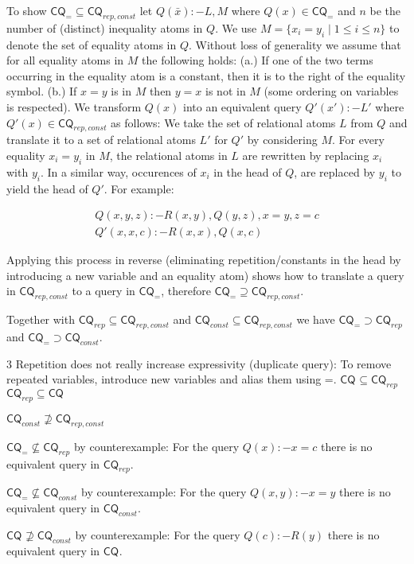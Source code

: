 \documentclass[a4paper,12pt]{article}
\newcommand{\cq}[1]{\ensuremath{\mathsf{CQ}_{#1}}}
\begin{document}
To show $\cq{=} \subseteq \cq{rep,const}$ let $Q(\bar{x}) :- L, M$ where $Q(x) \in \cq{=}$ and $n$ be the number of (distinct) inequality atoms in $Q$. We use $M = \{ x_i = y_i \mid 1 \leq i \leq n\}$ to denote the set of equality atoms in $Q$. Without loss of generality we assume that for all equality atoms in $M$ the following holds: (a.) If one of the two terms occurring in the equality atom is a constant, then it is to the right of the equality symbol. (b.) If $x = y$ is in $M$ then $y = x$ is not in $M$ (some ordering on variables is respected). We transform $Q(x)$ into an equivalent query $Q'(x') :- L'$ where $Q'(x) \in \cq{rep,const}$ as follows: We take the set of relational atoms $L$ from $Q$ and translate it to a set of relational atoms $L'$ for $Q'$ by considering $M$. For every equality $x_i = y_i$ in $M$, the relational atoms in $L$ are rewritten by replacing $x_i$ with $y_i$. In a similar way, occurences of $x_i$ in the head of $Q$, are replaced by $y_i$ to yield the head of $Q'$. For example:

\begin{align}
Q(x,y,z) :- R(x,y), Q(y,z), x = y, z = c \\
Q'(x,x,c) :- R(x,x), Q(x,c)
\end{align}

Applying this process in reverse (eliminating repetition/constants in the head by introducing a new variable and an equality atom) shows how to translate a query in \cq{rep,const} to a query in \cq{=}, therefore $\cq{=} \supseteq \cq{rep,const}$.

Together with $\cq{rep} \subseteq \cq{rep,const}$ and $\cq{const} \subseteq \cq{rep,const}$ we have $\cq{=} \supset \cq{rep}$ and $\cq{=} \supset \cq{const}$.

3 Repetition does not really increase expressivity (duplicate query):
To remove repeated variables, introduce new variables and alias them using =.
$\cq{}    \subseteq \cq{rep}$
$\cq{rep} \subseteq \cq{}$

$\cq{const} \not \supseteq \cq{rep,const}$

$\cq{=} \not \subseteq \cq{rep}$ by counterexample: For the query $Q(x) :- x = c$ there is no equivalent query in \cq{rep}.

$\cq{=} \not \subseteq \cq{const}$ by counterexample: For the query $Q(x,y) :- x = y$ there is no equivalent query in \cq{const}.

$\cq{} \not \supseteq \cq{const}$ by counterexample: For the query $Q(c) :- R(y)$ there is no equivalent query in \cq{}. 
\end{document}
